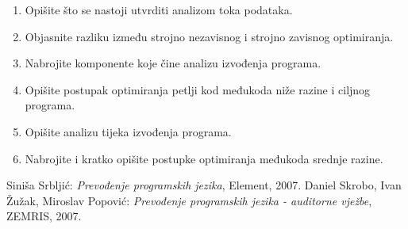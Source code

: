 \documentclass[times, 12pt, utf8]{book}
\begin{document}

\begin{enumerate}[resume]

\item 
Opišite što se nastoji utvrditi analizom toka podataka. \cite[str.~301-302]{udzbenik}

\item
Objasnite razliku između strojno nezavisnog i strojno zavisnog optimiranja. \cite[str.~294]{udzbenik}

\item
Nabrojite komponente koje čine analizu izvođenja programa. \cite[str.~297]{udzbenik}

\item
Opišite postupak optimiranja petlji kod međukoda niže razine i ciljnog programa. \cite[str.~311-312]{udzbenik}

\item
Opišite analizu tijeka izvođenja programa. \cite[str.~298-301]{udzbenik}

\item
Nabrojite i kratko opišite postupke optimiranja međukoda srednje razine. \cite[str.~316-317]{udzbenik}
\end{enumerate}

\newpage
{}
\begin{thebibliography}{10}
Siniša Srbljić:
\emph{Prevođenje programskih jezika}, Element, 2007.
Daniel Skrobo, Ivan Žužak, Miroslav Popović:
\emph{Prevođenje programskih jezika - auditorne vježbe}, ZEMRIS, 2007.
\end{thebibliography}
\end{document}
